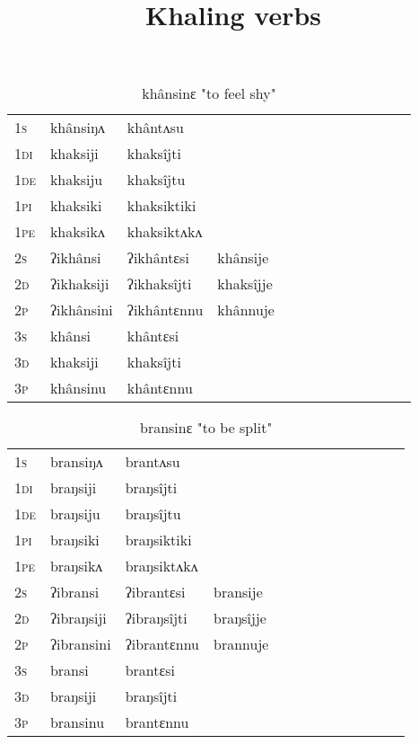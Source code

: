 \documentclass[oldfontcommands,oneside,a4paper,11pt]{article}
\begin{document}
 \title{Khaling verbs}
 
 
 \maketitle
 



\begin{table}[H]
\label{ak.vr} \centering 
\caption{khânsinɛ  "to feel shy"  }
\begin{tabular}{l|l|l|l|l|l|l|l|l|l|l|l|l}  \toprule
\textsc{1s} &khânsiŋʌ &khântʌsu \\ 
\textsc{1di} &khaksiji &khaksîjti   \\
\textsc{1de} &khaksiju &khaksîjtu   \\ 
\textsc{1pi} &khaksiki &khaksiktiki   \\ 
\textsc{1pe} &khaksikʌ &khaksiktʌkʌ   \\ 
\textsc{2s} & ʔikhânsi & ʔikhântɛsi &khânsije  \\ 
\textsc{2d} & ʔikhaksiji & ʔikhaksîjti &khaksîjje    \\
\textsc{2p} & ʔikhânsini  & ʔikhântɛnnu &khânnuje  \\ 
\textsc{3s} & khânsi & khântɛsi   \\ 
\textsc{3d} & khaksiji & khaksîjti   \\ 
\textsc{3p} & khânsinu  & khântɛnnu \\ 
\bottomrule
\end{tabular}
\end{table}


\begin{table}[H]
\label{aŋ.vr} \centering 
\caption{bransinɛ  "to be split"  }
\begin{tabular}{l|l|l|l|l|l|l|l|l|l|l|l|l}  \toprule
\textsc{1s} &bransiŋʌ &brantʌsu \\ 
\textsc{1di} &braŋsiji &braŋsîjti   \\
\textsc{1de} &braŋsiju &braŋsîjtu   \\ 
\textsc{1pi} &braŋsiki &braŋsiktiki   \\ 
\textsc{1pe} &braŋsikʌ &braŋsiktʌkʌ   \\ 
\textsc{2s} & ʔibransi & ʔibrantɛsi &bransije  \\ 
\textsc{2d} & ʔibraŋsiji & ʔibraŋsîjti &braŋsîjje    \\
\textsc{2p} & ʔibransini  & ʔibrantɛnnu &brannuje  \\ 
\textsc{3s} & bransi & brantɛsi   \\ 
\textsc{3d} & braŋsiji & braŋsîjti   \\ 
\textsc{3p} & bransinu  & brantɛnnu \\ 
\bottomrule
\end{tabular}
\end{table}
\end{document}
